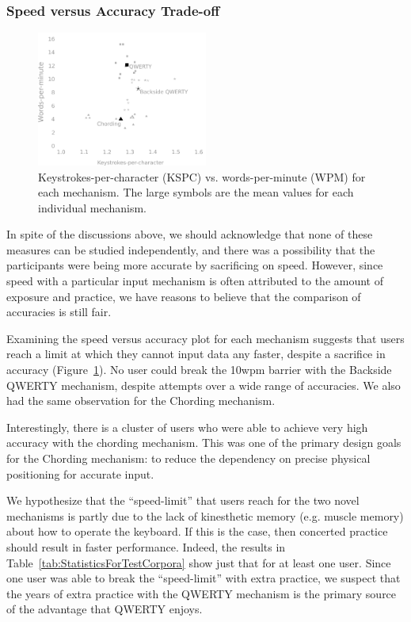 \subsubsection{Speed versus Accuracy Trade-off}

\begin{figure}
    \includegraphics[width=0.5\textwidth]{Figures/kspc_vs_wpm.pdf} 
    \caption{Keystrokes-per-character (KSPC) vs. words-per-minute
      (WPM) for each mechanism.  The large symbols are the mean values
      for each individual mechanism. }
    \label{fig:kspc_vs_wpm}
\end{figure}

In spite of the discussions above, we should acknowledge that none of
these measures can be studied independently, and there was a
possibility that the participants were being more accurate by
sacrificing on speed. However, since speed with a particular input
mechanism is often attributed to the amount of exposure and practice,
we have reasons to believe that the comparison of accuracies is still fair. 

Examining the speed versus accuracy plot for each mechanism suggests
that users reach a limit at which they cannot input data any faster,
despite a sacrifice in accuracy (Figure~\ref{fig:kspc_vs_wpm}).  No
user could break the 10wpm barrier with the Backside QWERTY mechanism,
despite attempts over a wide range of accuracies.  We also had the same observation for the Chording mechanism.

Interestingly, there is a cluster of users who were able to achieve
very high accuracy with the chording mechanism.  This was one of the
primary design goals for the Chording mechanism: to reduce the dependency on precise physical positioning for accurate input.

We hypothesize that the ``speed-limit'' that users reach for the two
novel mechanisms is partly due to the lack of kinesthetic memory
(e.g. muscle memory) about how to operate the keyboard.  If this is
the case, then concerted practice should result in faster performance.
Indeed, the results in Table~\ref{tab:StatisticsForTestCorpora} show
just that for at least one user.  Since one user was able to break the
``speed-limit'' with extra practice, we suspect that the years of
extra practice with the QWERTY mechanism is the primary source of the
advantage that QWERTY enjoys.

